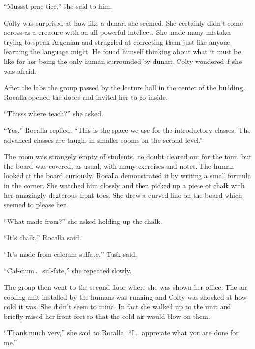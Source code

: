``Mussst prac-tice,'' she said to him.

Colty was surprised at how like a dunari she seemed. She certainly didn't come across as a
creature with an all powerful intellect. She made many mistakes trying to speak Argenian and
struggled at correcting them just like anyone learning the language might. He found himself
thinking about what it must be like for her being the only human surrounded by dunari. Colty
wondered if she was afraid.

After the labs the group passed by the lecture hall in the center of the building. Rocalla
opened the doors and invited her to go inside.

``Thisss where teach?'' she asked.

``Yes,'' Rocalla replied. ``This is the space we use for the introductory classes. The advanced
classes are taught in smaller rooms on the second level.''

The room was strangely empty of students, no doubt cleared out for the tour, but the board was
covered, as usual, with many exercises and notes. The human looked at the board curiously.
Rocalla demonstrated it by writing a small formula in the corner. She watched him closely and
then picked up a piece of chalk with her amazingly dexterous front toes. She drew a curved line
on the board which seemed to please her.

``What made from?'' she asked holding up the chalk.

``It's chalk,'' Rocalla said.


``It's made from calcium sulfate,'' Tusk said.

``Cal-cium\ldots\ sul-fate,'' she repeated slowly.

The group then went to the second floor where she was shown her office. The air cooling unit
installed by the humans was running and Colty was shocked at how cold it was. She didn't seem to
mind. In fact she walked up to the unit and briefly raised her front feet so that the cold air
would blow on them.

``Thank much very,'' she said to Rocalla. ``I\ldots\ appreiate what you are done for me.''

